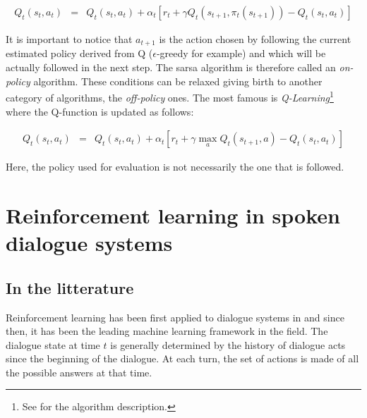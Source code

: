 			\begin{eqnarray}
				Q_t(s_t,a_t) & = & Q_t(s_t,a_t) + \alpha_t [r_t + \gamma Q_t(s_{t+1},\pi_t(s_{t+1})) - Q_t(s_t,a_t)] \label{eq:sarsaupdate}
			\end{eqnarray}
			
			It is important to notice that $a_{t+1}$ is the action chosen by following the current estimated policy derived from Q ($\epsilon$-greedy for example) and which will be actually followed in the next step. The sarsa algorithm is therefore called an \textit{on-policy} algorithm. These conditions can be relaxed giving birth to another category of algorithms, the \textit{off-policy} ones. The most famous is \textit{Q-Learning}\footnote{See \cite{Sutton1998} for the algorithm description.} \cite{Watkins1989} where the Q-function is updated as follows:
			
			\begin{eqnarray}
				Q_t(s_t,a_t) & = & Q_t(s_t,a_t) + \alpha_t [r_t + \gamma \max_a Q_t(s_{t+1},a) - Q_t(s_t,a_t)] \label{eq:qlearningupdate}
			\end{eqnarray}
			
			Here, the policy used for evaluation is not necessarily the one that is followed.

\section{Reinforcement learning in spoken dialogue systems}
	
	\subsection{In the litterature}
	
		Reinforcement learning has been first applied to dialogue systems in \cite{Levin1997b} and since then, it has been the leading machine learning framework in the field. The dialogue state at time $t$ is generally determined by the history of dialogue acts since the beginning of the dialogue. At each turn, the set of actions is made of all the possible answers at that time.
		
